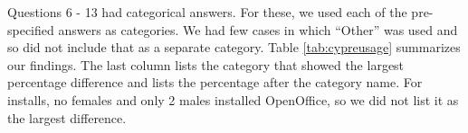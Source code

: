 \begin{table}[tpb]
\caption{Comparing male and female participants on questions coded as numbers, Rows show mean
for females, mean for males and p value for T-test.}
\label{tab:cypregender}
\end{table}

Questions 6 - 13 had categorical answers. For these, we used each of the pre-specified answers as categories. We had few cases in which ``Other'' was used and so did not include that as a separate category. Table \ref{tab:cypreusage} summarizes our findings. The last column lists the category that showed the largest percentage difference and lists the percentage after the category name. For installs, no females and only 2 males installed OpenOffice, so we did not list it as the largest difference.

